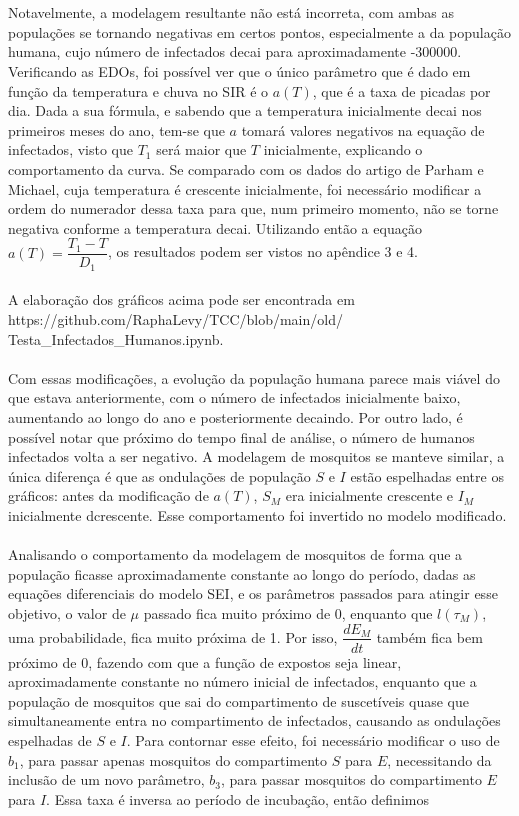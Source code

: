 \documentclass[12pt]{article}
\begin{document}
\\\\
Notavelmente, a modelagem resultante não está incorreta, com ambas as populações se tornando negativas em certos pontos, especialmente a da população humana, cujo número de infectados decai para aproximadamente -300000. Verificando as EDOs, foi possível ver que o único parâmetro que é dado em função da temperatura e chuva no SIR é o $a(T)$, que é a taxa de picadas por dia. Dada a sua fórmula, e sabendo que a temperatura inicialmente decai nos primeiros meses do ano, tem-se que $a$ tomará valores negativos na equação de infectados, visto que $T_1$ será maior que $T$ inicialmente, explicando o comportamento da curva. Se comparado com os dados do artigo de Parham e Michael, cuja temperatura é crescente inicialmente, foi necessário modificar a ordem do numerador dessa taxa para que, num primeiro momento, não se torne negativa conforme a temperatura decai. Utilizando então a equação $a(T) = \dfrac{T_1-T}{D_1}$, os resultados podem ser vistos no apêndice 3 e 4.
\\\\
A elaboração dos gráficos acima pode ser encontrada em
\\
https://github.com/RaphaLevy/TCC/blob/main/old/
\\
Testa\_Infectados\_Humanos.ipynb.
\\\\
Com essas modificações, a evolução da população humana parece mais viável do que estava anteriormente, com o número de infectados inicialmente baixo, aumentando ao longo do ano e posteriormente decaindo. Por outro lado, é possível notar que próximo do tempo final de análise, o número de humanos infectados volta a ser negativo. A modelagem de mosquitos se manteve similar, a única diferença é que as ondulações de população $S$ e $I$ estão espelhadas entre os gráficos: antes da modificação de $a(T)$, $S_M$ era inicialmente crescente e $I_M$ inicialmente dcrescente. Esse comportamento foi invertido no modelo modificado.
\\\\
Analisando o comportamento da modelagem de mosquitos de forma que a população ficasse aproximadamente constante ao longo do período, dadas as equações diferenciais do modelo SEI, e os parâmetros passados para atingir esse objetivo, o valor de $\mu$ passado fica muito próximo de 0, enquanto que $l(\tau_M)$, uma probabilidade, fica muito próxima de 1. Por isso, $\dfrac{dE_M}{dt}$ também fica bem próximo de 0, fazendo com que a função de expostos seja linear, aproximadamente constante no número inicial de infectados, enquanto que a população de mosquitos que sai do compartimento de suscetíveis quase que simultaneamente entra no compartimento de infectados, causando as ondulações espelhadas de $S$ e $I$. Para contornar esse efeito, foi necessário modificar o uso de $b_1$, para passar apenas mosquitos do compartimento $S$ para $E$, necessitando da inclusão de um novo parâmetro, $b_3$, para passar mosquitos do compartimento $E$ para $I$. Essa taxa é inversa ao período de incubação, então definimos
\end{document}
